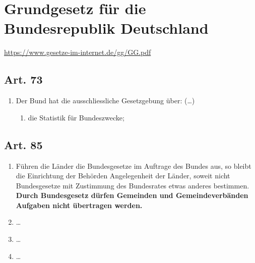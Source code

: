\chapter[GG]{Grundgesetz für die Bundesrepublik Deutschland}
\newline
\url{https://www.gesetze-im-internet.de/gg/GG.pdf}
    \section{Art. 73}
        \begin{enumerate}[label=(\arabic*)]
            \item Der Bund hat die ausschliessliche Gesetzgebung über:
            \newline
            (\dots)
                \begin{enumerate}[label=\arabic*.,start=11]
                    \item  die Statistik für Bundeszwecke;
                \end{enumerate}

            
        \end{enumerate}
    \section{Art. 85}
        \begin{enumerate}[label=(\arabic*)]
            \item Führen die Länder die Bundesgesetze im Auftrage des Bundes aus, so bleibt die Einrichtung der Behörden Angelegenheit der Länder, soweit nicht Bundesgesetze mit Zustimmung des Bundesrates etwas anderes bestimmen. \textbf{Durch Bundesgesetz dürfen Gemeinden und Gemeindeverbänden Aufgaben nicht übertragen werden.}
            \item \dots
            \item \dots
            \item \dots
        \end{enumerate}